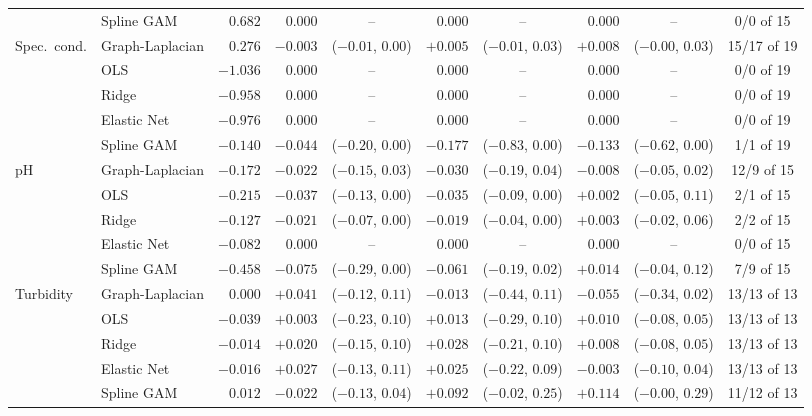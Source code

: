 \documentclass[11pt]{article}
\begin{document}
\begin{table}[h]
\begin{tabular}{ll r rc rc rc c}
              & Spline GAM      & $0.682$ & $0.000$ & -- & $0.000$ & -- & $0.000$ & -- & 0/0 of 15 \\
\addlinespace
Spec.\ cond.  & Graph-Laplacian & $0.276$ & $-0.003$ & ($-0.01$, $0.00$) & $+0.005$ & ($-0.01$, $0.03$) & $+0.008$ & ($-0.00$, $0.03$) & 15/17 of 19 \\
              & OLS             & $-1.036$ & $0.000$ & -- & $0.000$ & -- & $0.000$ & -- & 0/0 of 19 \\
              & Ridge           & $-0.958$ & $0.000$ & -- & $0.000$ & -- & $0.000$ & -- & 0/0 of 19 \\
              & Elastic Net     & $-0.976$ & $0.000$ & -- & $0.000$ & -- & $0.000$ & -- & 0/0 of 19 \\
              & Spline GAM      & $-0.140$ & $-0.044$ & ($-0.20$, $0.00$) & $-0.177$ & ($-0.83$, $0.00$) & $-0.133$ & ($-0.62$, $0.00$) & 1/1 of 19 \\
\addlinespace
pH            & Graph-Laplacian & $-0.172$ & $-0.022$ & ($-0.15$, $0.03$) & $-0.030$ & ($-0.19$, $0.04$) & $-0.008$ & ($-0.05$, $0.02$) & 12/9 of 15 \\
              & OLS             & $-0.215$ & $-0.037$ & ($-0.13$, $0.00$) & $-0.035$ & ($-0.09$, $0.00$) & $+0.002$ & ($-0.05$, $0.11$) & 2/1 of 15 \\
              & Ridge           & $-0.127$ & $-0.021$ & ($-0.07$, $0.00$) & $-0.019$ & ($-0.04$, $0.00$) & $+0.003$ & ($-0.02$, $0.06$) & 2/2 of 15 \\
              & Elastic Net     & $-0.082$ & $0.000$ & -- & $0.000$ & -- & $0.000$ & -- & 0/0 of 15 \\
              & Spline GAM      & $-0.458$ & $-0.075$ & ($-0.29$, $0.00$) & $-0.061$ & ($-0.19$, $0.02$) & $+0.014$ & ($-0.04$, $0.12$) & 7/9 of 15 \\
\addlinespace
Turbidity     & Graph-Laplacian & $0.000$ & $+0.041$ & ($-0.12$, $0.11$) & $-0.013$ & ($-0.44$, $0.11$) & $-0.055$ & ($-0.34$, $0.02$) & 13/13 of 13 \\
              & OLS             & $-0.039$ & $+0.003$ & ($-0.23$, $0.10$) & $+0.013$ & ($-0.29$, $0.10$) & $+0.010$ & ($-0.08$, $0.05$) & 13/13 of 13 \\
              & Ridge           & $-0.014$ & $+0.020$ & ($-0.15$, $0.10$) & $+0.028$ & ($-0.21$, $0.10$) & $+0.008$ & ($-0.08$, $0.05$) & 13/13 of 13 \\
              & Elastic Net     & $-0.016$ & $+0.027$ & ($-0.13$, $0.11$) & $+0.025$ & ($-0.22$, $0.09$) & $-0.003$ & ($-0.10$, $0.04$) & 13/13 of 13 \\
              & Spline GAM      & $0.012$ & $-0.022$ & ($-0.13$, $0.04$) & $+0.092$ & ($-0.02$, $0.25$) & $+0.114$ & ($-0.00$, $0.29$) & 11/12 of 13 \\
\bottomrule
\end{tabular}
\end{table}
\end{document}
